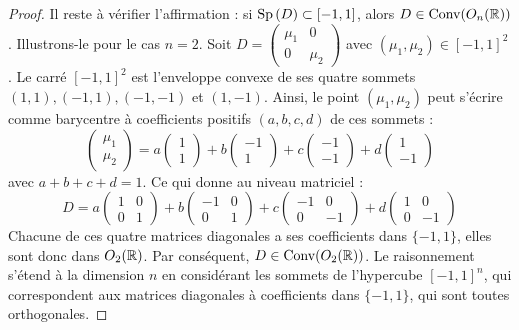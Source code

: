 \begin{proof}
    Il reste à vérifier l'affirmation : si $\operatorname{Sp} \,(D) \subset [-1, 1]$, alors $D \in \text{Conv}(O_n(\mathbb{R}))$.
    Illustrons-le pour le cas $n=2$. Soit $D = \begin{pmatrix} \mu_1 & 0 \\ 0 & \mu_2 \end{pmatrix}$ avec $(\mu_1, \mu_2) \in [-1, 1]^2$.
    Le carré $[-1, 1]^2$ est l'enveloppe convexe de ses quatre sommets $(1, 1), (-1, 1), (-1, -1)$ et $(1, -1)$.
    Ainsi, le point $(\mu_1, \mu_2)$ peut s'écrire comme barycentre à coefficients positifs $(a, b, c, d)$ de ces sommets :
    \[
    \begin{pmatrix} \mu_1 \\ \mu_2 \end{pmatrix} = a \begin{pmatrix} 1 \\ 1 \end{pmatrix} + b \begin{pmatrix} -1 \\ 1 \end{pmatrix} + c \begin{pmatrix} -1 \\ -1 \end{pmatrix} + d \begin{pmatrix} 1 \\ -1 \end{pmatrix}
    \]
    avec $a+b+c+d=1$. Ce qui donne au niveau matriciel :
    \[
    D = a \begin{pmatrix} 1 & 0 \\ 0 & 1 \end{pmatrix} + b \begin{pmatrix} -1 & 0 \\ 0 & 1 \end{pmatrix} + c \begin{pmatrix} -1 & 0 \\ 0 & -1 \end{pmatrix} + d \begin{pmatrix} 1 & 0 \\ 0 & -1 \end{pmatrix}
    \]
    Chacune de ces quatre matrices diagonales a ses coefficients dans $\{-1, 1\}$, elles sont donc dans $O_2(\mathbb{R})$.
    Par conséquent, $D \in \text{Conv}(O_2(\mathbb{R}))$. Le raisonnement s'étend à la dimension $n$ en considérant les sommets de l'hypercube $[-1, 1]^n$, qui correspondent aux matrices diagonales à coefficients dans $\{-1, 1\}$, qui sont toutes orthogonales.
\end{proof}

